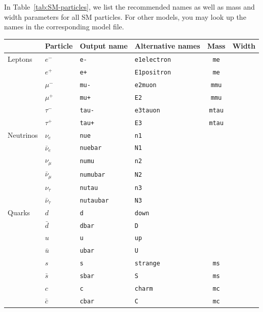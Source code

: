 \documentclass[12pt]{book}
\newcommand{\ttt}[1]{\texttt{#1}}
\begin{document}
In Table~\ref{tab:SM-particles}, we list the recommended names as well as
mass and width parameters for all SM particles.  For other models, you may
look up the names in the corresponding model file.

\begin{table}[p]
  \begin{center}
    \begin{tabular}{|l|l|l|l|cc|}
      \hline
      & Particle & Output name & Alternative names & Mass & Width\\
      \hline\hline
      Leptons
      &$e^-$ & \verb|e-| & \ttt{e1}\quad\ttt{electron} & \ttt{me} & \\
      &$e^+$ & \verb|e+| & \ttt{E1}\quad\ttt{positron} & \ttt{me} & \\
      \hline
      &$\mu^-$ & \verb|mu-| & \ttt{e2}\quad\ttt{muon} & \ttt{mmu} & \\
      &$\mu^+$ & \verb|mu+| & \ttt{E2} & \ttt{mmu} & \\
      \hline
      &$\tau^-$ & \verb|tau-| & \ttt{e3}\quad\ttt{tauon} & \ttt{mtau} & \\
      &$\tau^+$ & \verb|tau+| & \ttt{E3} & \ttt{mtau} & \\
      \hline\hline
      Neutrinos
      &$\nu_e$ & \verb|nue| & \ttt{n1} & & \\
      &$\bar\nu_e$ & \verb|nuebar| & \ttt{N1} & & \\
      \hline
      &$\nu_\mu$ & \verb|numu| & \ttt{n2} & & \\
      &$\bar\nu_\mu$ & \verb|numubar| & \ttt{N2} & & \\
      \hline
      &$\nu_\tau$ & \verb|nutau| & \ttt{n3} & & \\
      &$\bar\nu_\tau$ & \verb|nutaubar| & \ttt{N3} & & \\
      \hline\hline
      Quarks
      &$d$ & \verb|d| & \ttt{down} & & \\
      &$\bar d$ & \verb|dbar| & \ttt{D} & & \\
      \hline
      &$u$ & \verb|u| & \ttt{up} & & \\
      &$\bar u$ & \verb|ubar| & \ttt{U} & & \\
      \hline
      &$s$ & \verb|s| & \ttt{strange} & \ttt{ms} & \\
      &$\bar s$ & \verb|sbar| & \ttt{S} & \ttt{ms}  & \\
      \hline
      &$c$ & \verb|c| & \ttt{charm} & \ttt{mc}  & \\
      &$\bar c$ & \verb|cbar| & \ttt{C} & \ttt{mc} & \\

\end{tabular}
\end{center}
\end{table}
\end{document}
